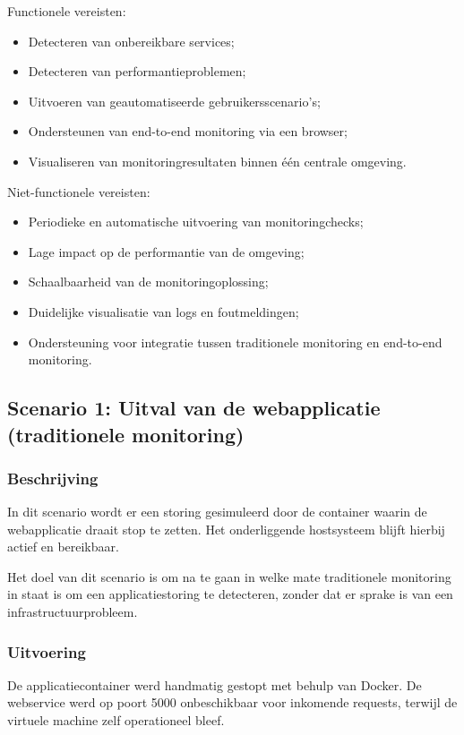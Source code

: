 Functionele vereisten:
\begin{itemize}
    \item Detecteren van onbereikbare services;
    \item Detecteren van performantieproblemen;
    \item Uitvoeren van geautomatiseerde gebruikersscenario’s;
    \item Ondersteunen van end-to-end monitoring via een browser;
    \item Visualiseren van monitoringresultaten binnen één centrale omgeving.
\end{itemize}

Niet-functionele vereisten:
\begin{itemize}
    \item Periodieke en automatische uitvoering van monitoringchecks;
    \item Lage impact op de performantie van de omgeving;
    \item Schaalbaarheid van de monitoringoplossing;
    \item Duidelijke visualisatie van logs en foutmeldingen;
    \item Ondersteuning voor integratie tussen traditionele monitoring en end-to-end monitoring.
\end{itemize}

\subsection{Scenario 1: Uitval van de webapplicatie (traditionele monitoring)}

\subsubsection{Beschrijving}

In dit scenario wordt er een storing gesimuleerd door de container waarin de webapplicatie draait stop te zetten. Het onderliggende hostsysteem blijft hierbij actief en bereikbaar.

Het doel van dit scenario is om na te gaan in welke mate traditionele monitoring in staat is om een applicatiestoring te detecteren, zonder dat er sprake is van een infrastructuurprobleem.

\subsubsection{Uitvoering}

De applicatiecontainer werd handmatig gestopt met behulp van Docker. De webservice werd op poort 5000 onbeschikbaar voor inkomende requests, terwijl de virtuele machine zelf operationeel bleef.


